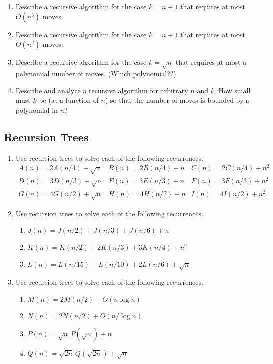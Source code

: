 \begin{exercises}
\begin{enumerate}[label=\arabic*.,ref=\thechapter.\arabic*,leftmargin=*,align=left,itemsep=1.5ex plus 0.5ex]
\begin{enumerate}
\item Describe a recursive algorithm for the case $k = n + 1$ that requires at most $O(n^3)$ moves. 
\item {} Describe a recursive algorithm for the case $k = n + 1$ that requires at most $O(n^2)$ moves. 
\item {} Describe a recursive algorithm for the case $k = \sqrt{n}$ that requires at most a polynomial number of moves. (Which polynomial??)
\item {} Describe and analyze a recursive algorithm for arbitrary $n$ and $k$. How small must $k$ be (as a function of $n$) so that the number of moves is bounded by a polynomial in $n$?
\end{enumerate}
\end{enumerate}

\subsection*{Recursion Trees}

\begin{enumerate}[label=\arabic*.,ref=\thechapter.\arabic*,leftmargin=*,align=left,itemsep=1.5ex plus 0.5ex,resume]
\item Use recursion trees to solve each of the following recurrences.
\[
\begin{array}{lll}
A(n) = 2A(n/4) + \sqrt{n} & B(n) = 2B(n/4) + n & C(n) = 2C(n/4) + n^2\\
D(n) = 3D(n/3) + \sqrt{n} & E(n) = 3E(n/3) + n & F(n) = 3F(n/3) + n^2\\
G(n) = 4G(n/2) + \sqrt{n} & H(n) = 4H(n/2) + n & I(n) = 4I(n/2) + n^2
\end{array}
\]
\item Use recursion trees to solve each of the following recurrences.
\begin{enumerate}
\item[(j)] $J(n) = J(n/2) + J(n/3) + J(n/6) + n$
\item[(k)] $K(n) = K(n/2) + 2K(n/3) + 3K(n/4) + n^2$
\item[(l)] $L(n) = L(n/15) + L(n/10) + 2L(n/6) + \sqrt{n}$
\end{enumerate}
\item {} Use recursion trees to solve each of the following recurrences.
\begin{enumerate}
\item[(m)] $M(n) = 2M(n/2) + O(n \log n)$
\item[(n)] $N(n) = 2N(n/2) + O(n/\log n)$
\item[(p)] $P(n) = \sqrt{n}\,P(\sqrt{n}) + n$
\item[(q)] $Q(n) = \sqrt{2n}\,Q(\sqrt{2n}) + \sqrt{n}$
\end{enumerate}
\end{enumerate}


\end{exercises}
